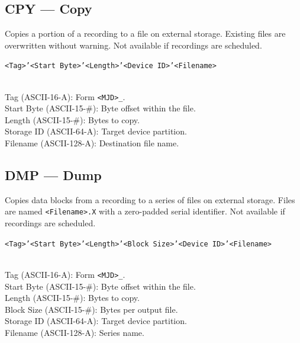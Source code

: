 \subsection{CPY --- Copy}
\label{cmd:cpy}
\begin{description}[style=nextline]
    \item[Description:]
        Copies a portion of a recording to a file on external storage.
        Existing files are overwritten without warning.  Not available if
        recordings are scheduled.
    \item[Argument Format:]
        \texttt{<Tag>'<Start Byte>'<Length>'<Device ID>'<Filename>}
    \item[Arguments:]~\\
        Tag (ASCII-16-A): Form \texttt{<MJD>\_<Reference Number>}. \\
        Start Byte (ASCII-15-\#): Byte offset within the file. \\
        Length (ASCII-15-\#): Bytes to copy. \\
        Storage ID (ASCII-64-A): Target device partition. \\
        Filename (ASCII-128-A): Destination file name.
\end{description}

\subsection{DMP --- Dump}
\label{cmd:dmp}
\begin{description}[style=nextline]
    \item[Description:]
        Copies data blocks from a recording to a series of files on external
        storage.  Files are named \texttt{<Filename>.X} with a zero-padded
        serial identifier.  Not available if recordings are scheduled.
    \item[Argument Format:]
        \texttt{<Tag>'<Start Byte>'<Length>'<Block Size>'<Device ID>'<Filename>}
    \item[Arguments:]~\\
        Tag (ASCII-16-A): Form \texttt{<MJD>\_<Reference Number>}. \\
        Start Byte (ASCII-15-\#): Byte offset within the file. \\
        Length (ASCII-15-\#): Bytes to copy. \\
        Block Size (ASCII-15-\#): Bytes per output file. \\
        Storage ID (ASCII-64-A): Target device partition. \\
        Filename (ASCII-128-A): Series name.
\end{description}

